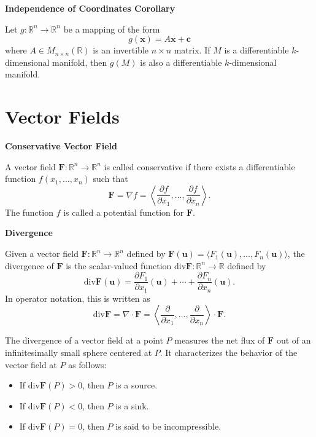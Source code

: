 \documentclass{article}
\newcommand{\R}{\mathbb{R}}
\newenvironment{definition}[1]{
    \par\noindent\textbf{#1}\par\noindent
}{
    \par \vspace{0.5cm}
}
\begin{document}
\begin{definition}{Independence of Coordinates Corollary}
Let \( g: \R^n \to \R^n \) be a mapping of the form
\[ g(\bm{x}) = A\bm{x} + \bm{c} \]
where \( A \in M_{n \times n}(\R) \) is an invertible \( n \times n \) matrix. If \( M \) is a differentiable \( k \)-dimensional manifold, then \( g(M) \) is also a differentiable \( k \)-dimensional manifold.
\end{definition}


\section{Vector Fields}

\begin{definition}{Conservative Vector Field}
A vector field \(\bm{F} : \R^n \to \R^n\) is called conservative if there exists a differentiable function \(f(x_1, \ldots, x_n)\) such that
\[\bm{F} = \nabla f = \left\langle \frac{\partial f}{\partial x_1}, \ldots, \frac{\partial f}{\partial x_n} \right\rangle.\]
The function \(f\) is called a potential function for \(\bm{F}\).
\end{definition}


\begin{definition}{Divergence}
Given a vector field \(\bm{F} : \R^n \rightarrow \R^n\) defined by \(\bm{F}(\bm{u}) = \langle F_1(\bm{u}), \ldots, F_n(\bm{u}) \rangle\), the divergence of \(\bm{F}\) is the scalar-valued function div\(\bm{F} : \R^n \rightarrow \R\) defined by
\[ \text{div}\bm{F}(\bm{u}) = \frac{\partial F_1}{\partial x_1}(\bm{u}) + \cdots + \frac{\partial F_n}{\partial x_n}(\bm{u}). \]
In operator notation, this is written as
\[ \text{div}\bm{F} = \nabla \cdot \bm{F} = \left\langle \frac{\partial}{\partial x_1}, \ldots, \frac{\partial}{\partial x_n} \right\rangle \cdot \bm{F}. \]

The divergence of a vector field at a point \(P\) measures the net flux of \(\bm{F}\) out of an infinitesimally small sphere centered at \(P\). It characterizes the behavior of the vector field at \(P\) as follows:
\begin{itemize}
    \item If \(\text{div}\bm{F}(P) > 0\), then \(P\) is a source.
    \item If \(\text{div}\bm{F}(P) < 0\), then \(P\) is a sink.
    \item If \(\text{div}\bm{F}(P) = 0\), then \(P\) is said to be incompressible.
\end{itemize}
\end{definition}
\end{document}
